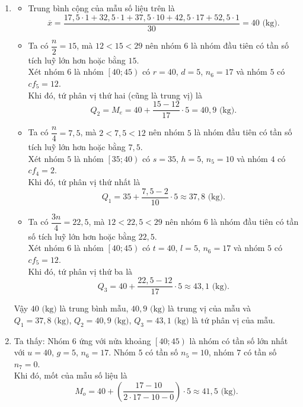 \begin{bt}
{\begin{enumerate}
			\item 
			\begin{itemize}
				\item Trung bình cộng của mẫu số liệu trên là
				\[
				\overline{x} = \dfrac{17{,}5 \cdot 1 + 32{,}5 \cdot 1 + 37{,}5 \cdot 10+ 42{,}5 \cdot 17+ 52{,}5 \cdot 1}{30} = 	40\text{ (kg)}.
				\]
				\item Ta có $\dfrac{n}{2} = 15$, mà $12<15<29$ nên nhóm $6$ là nhóm đầu tiên có tần số tích luỹ lớn hơn hoặc bằng $15$. \\
				Xét nhóm $6$ là nhóm $\left[40;45\right)$ có $r=40$, $d=5$, $n_6=17$ và nhóm $5$ có $cf_5 = 12$.\\
				Khi đó, tứ phân vị thứ hai (cũng là trung vị) là
				\[
				Q_2 = M_e = 40 + \dfrac{15-12}{17} \cdot 5 = 40{,}9\text{ (kg)}.
				\]
				\item Ta có $\dfrac{n}{4} = 7{,}5$, mà $2<7{,}5<12$ nên nhóm $5$ là nhóm đầu tiên có tần số tích luỹ lớn hơn hoặc bằng $7{,}5$. \\
				Xét nhóm $5$ là nhóm $\left[35;40\right)$ có $s=35$, $h=5$, $n_5=10$ và nhóm $4$ có $cf_4 = 2$.\\
				Khi đó, tứ phân vị thứ nhất là
				\[
				Q_1 = 35 + \dfrac{7{,}5 - 2}{10} \cdot 5 \approx 37{,}8\text{ (kg)}.
				\]
				\item Ta có $\dfrac{3n}{4} = 22{,}5$, mà $12 < 22{,}5 <29$ nên nhóm $6$ là nhóm đầu tiên có tần số tích luỹ lớn hơn hoặc bằng $22{,}5$. \\
				Xét nhóm $6$ là nhóm $\left[40;45\right)$ có $t=40$, $l=5$, $n_6=17$ và nhóm $5$ có $cf_5 = 12$.\\
				Khi đó, tứ phân vị thứ ba là
				\[
				Q_3 = 40 + \dfrac{22{,}5 - 12}{17} \cdot 5 \approx 43{,}1\text{ (kg)}.
				\]
			\end{itemize}
			Vậy $40\text{ (kg)}$ là trung bình mẫu, $40{,}9\text{ (kg)}$ là trung vị của mẫu và $Q_1 = 37{,}8\text{ (kg)}$, $Q_2 = 40{,}9\text{ (kg)}$, $Q_3 = 43{,}1\text{ (kg)}$ là tứ phân vị của mẫu.
			\item Ta thấy: Nhóm $6$ ứng với nửa khoảng $\left[40;45\right)$ là nhóm có tần số lớn nhất với $u=40$, $g=5$, $n_6 = 17$. Nhóm $5$ có tần số $n_5 = 10$, nhóm $7$ có tần số $n_7 = 0$.\\
			Khi đó, mốt của mẫu số liệu là 
			\[
			M_o = 40 + \left( \dfrac{17 - 10}{2\cdot 17 - 10 - 0} \right) \cdot 5 \approx 41{,}5\text{ (kg)}.
			\]
		\end{enumerate}
	}
\end{bt}

